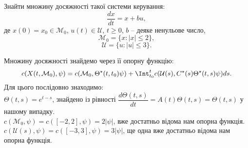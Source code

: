 \begin{problem}
    Знайти множину досяжності такої системи керування:
    \[\dfrac{dx}{dt} = x + bu,\] 
    де $x(0) = x_0 \in \mathcal{M}_0$, $u(t)\in \mathcal{U}$, $t\ge0$, $b$ -- деяке ненульове число, 
    \[ \mathcal{M}_0 = \{ x : | x | \le 2 \}, \]
    \[ \mathcal{U} = \{ u : |u| \le 3 \}. \]
\end{problem}

\begin{solution}
    Множину досяжності знайдемо через її опорну функцію: 
    \[ c(X(t, \mathcal{M}_0), \psi) = c(\mathcal{M}_0, \Theta^\star(t, t_0) \psi) + \Int_{t_0}^t c(\mathcal{U}(s), C^\star(s) \Theta^\star(t, s)\psi) ds. \]
    Для цього послідовно знаходимо: \\
    
    $\Theta(t, s) = e^{t-s}$, знайдено із рівності $\dfrac{d\Theta(t,s)}{dt} = A(t)\Theta(t,s) = \Theta(t,s)$ у нашому випадку. \\
    
    $c(\mathcal{M}_0, \psi) = c([-2, 2], \psi) = 2 |\psi|$, вже достатньо відома нам опорна функція. \\
    
    $c(\mathcal{U}(s), \psi) = c([-3, 3], \psi) = 3 |\psi|$, ще одна вже достатньо відома нам опорна функція. \\
    
    

\end{solution}
